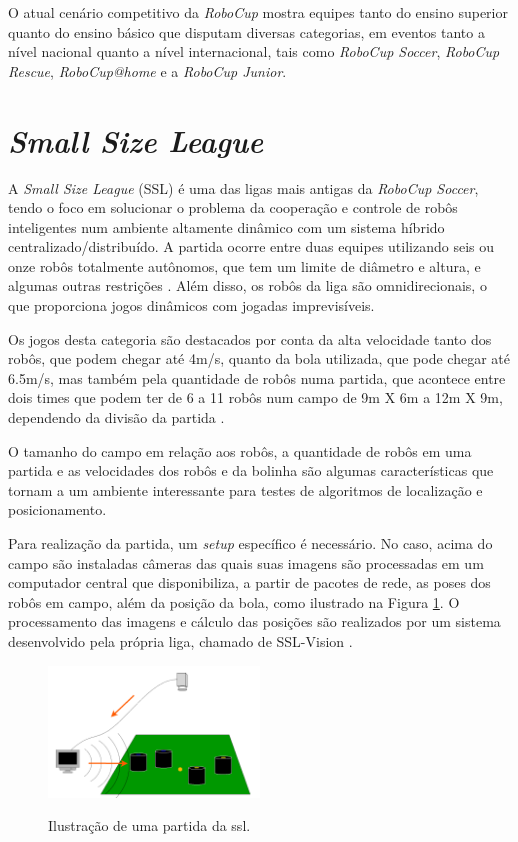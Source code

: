 \documentclass[acronym, symbols, table, deposito]{fei}
\begin{document}
		O atual cenário competitivo da \textit{RoboCup} mostra equipes tanto do ensino superior quanto do ensino básico que disputam diversas categorias, em eventos tanto a nível nacional quanto a nível internacional, tais como \textit{RoboCup Soccer}, \textit{RoboCup Rescue}, \textit{RoboCup@home} e a \textit{RoboCup Junior}.
	
	\section{\textit{Small Size League}} \label{sec:small_size_league}
	
		A \textit{Small Size League} (SSL) é uma das ligas mais antigas da \textit{RoboCup Soccer}, tendo o foco em solucionar o problema da cooperação e controle de robôs inteligentes num ambiente altamente dinâmico com um sistema híbrido centralizado/distribuído. A partida ocorre entre duas equipes utilizando seis ou onze robôs totalmente autônomos, que tem um limite de diâmetro e altura, e algumas outras restrições \cite{RoboCup}. Além disso, os robôs da liga são omnidirecionais, o que proporciona jogos dinâmicos com jogadas imprevisíveis.
		
		Os jogos desta categoria são destacados por conta da alta velocidade tanto dos robôs, que podem chegar até 4m/s, quanto da bola utilizada, que pode chegar até 6.5m/s, mas também pela quantidade de robôs numa partida, que acontece entre dois times que podem ter de 6 a 11 robôs num campo de 9m X 6m a 12m X 9m, dependendo da divisão da partida \cite{rules}.
		
		O tamanho do campo em relação aos robôs, a quantidade de robôs em uma partida e as velocidades dos robôs e da bolinha são algumas características que tornam a  um ambiente interessante para testes de algoritmos de localização e posicionamento.
		
		Para realização da partida, um \textit{setup} específico é necessário. No caso, acima do campo são instaladas câmeras das quais suas imagens são processadas em um computador central que disponibiliza, a partir de pacotes de rede, as poses dos robôs em campo, além da posição da bola, como ilustrado na Figura \ref{fig:ilustracao_partida_ssl}. O processamento das imagens e cálculo das posições são realizados por um sistema desenvolvido pela própria liga, chamado de SSL-Vision \cite{10.1007/978-3-642-11876-0_37}.
		
		\begin{figure}[!htb]
			\centering
			\caption{Ilustração de uma partida da \acrshort{ssl}.} 
			\includegraphics[width=0.5\textwidth]{funcionamento_ssl.png}
			\label{fig:ilustracao_partida_ssl}
		\end{figure}
		
\end{document}
